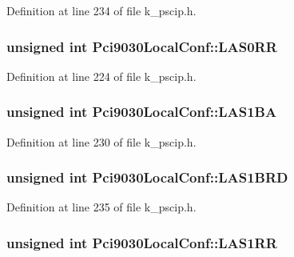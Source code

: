 Definition at line 234 of file k\_\-pscip.h.\hypertarget{struct_pci9030_local_conf_c27dcf44354ec5809d743275f64a403c}{
\subsubsection[{LAS0RR}]{\setlength{\rightskip}{0pt plus 5cm}unsigned int {\bf Pci9030LocalConf::LAS0RR}}}
\label{struct_pci9030_local_conf_c27dcf44354ec5809d743275f64a403c}




Definition at line 224 of file k\_\-pscip.h.\hypertarget{struct_pci9030_local_conf_f8f6d1e26a4001d9270f3a8c0753024f}{
\subsubsection[{LAS1BA}]{\setlength{\rightskip}{0pt plus 5cm}unsigned int {\bf Pci9030LocalConf::LAS1BA}}}
\label{struct_pci9030_local_conf_f8f6d1e26a4001d9270f3a8c0753024f}




Definition at line 230 of file k\_\-pscip.h.\hypertarget{struct_pci9030_local_conf_ff4f9d2abd8b3d3d4498d76195d28706}{
\subsubsection[{LAS1BRD}]{\setlength{\rightskip}{0pt plus 5cm}unsigned int {\bf Pci9030LocalConf::LAS1BRD}}}
\label{struct_pci9030_local_conf_ff4f9d2abd8b3d3d4498d76195d28706}




Definition at line 235 of file k\_\-pscip.h.\hypertarget{struct_pci9030_local_conf_64b33e3be91077893cedda99086b9c8c}{
\subsubsection[{LAS1RR}]{\setlength{\rightskip}{0pt plus 5cm}unsigned int {\bf Pci9030LocalConf::LAS1RR}}}
\label{struct_pci9030_local_conf_64b33e3be91077893cedda99086b9c8c}




